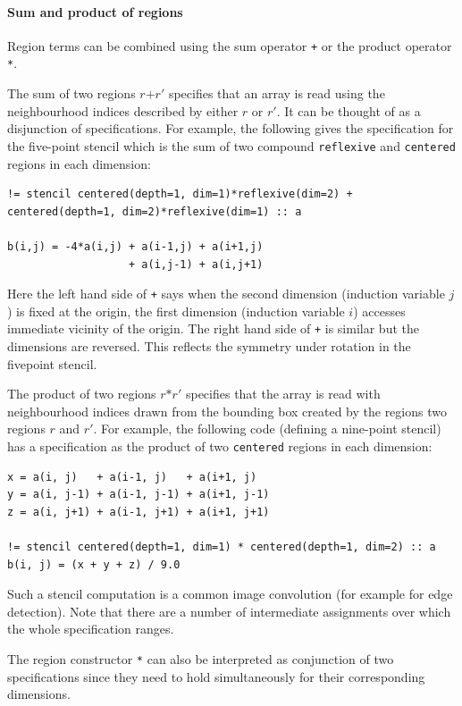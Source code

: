 \documentclass[9pt]{sigplanconf}
\theoremstyle{definition}
\newcommand{\term}[1]{\texttt{#1}}
\begin{document}
\paragraph{Sum and product of regions}
Region terms can be combined using the sum operator
\term{+} or the product operator \term{*}.

The sum of two regions $r \texttt{+} r'$ specifies that an array is
read using the neighbourhood indices described by either $r$ or
$r'$. It can be thought of as a disjunction of specifications. For
example, the following gives the specification for the five-point
stencil which is the sum of two compound \texttt{reflexive} and
\texttt{centered} regions in each dimension:
\begin{verbatim}
!= stencil centered(depth=1, dim=1)*reflexive(dim=2) + centered(depth=1, dim=2)*reflexive(dim=1) :: a

b(i,j) = -4*a(i,j) + a(i-1,j) + a(i+1,j)
                   + a(i,j-1) + a(i,j+1)
\end{verbatim}
Here the left hand side of \texttt{+} says when the second dimension
(induction variable $j$) is fixed at the origin, the first dimension
(induction variable $i$) accesses immediate vicinity of the origin.
The right hand side of \texttt{+} is similar but the dimensions are reversed.
This reflects the symmetry under rotation in the fivepoint stencil.

The product of two regions $r \texttt{*} r'$ specifies that the array
is read with neighbourhood indices drawn from the bounding box created
by the regions two regions $r$ and $r'$. For example, the following
code (defining a nine-point stencil) has a specification as the
product of two \texttt{centered} regions in each dimension:
\begin{verbatim}
x = a(i, j)   + a(i-1, j)   + a(i+1, j)
y = a(i, j-1) + a(i-1, j-1) + a(i+1, j-1)
z = a(i, j+1) + a(i-1, j+1) + a(i+1, j+1)

!= stencil centered(depth=1, dim=1) * centered(depth=1, dim=2) :: a
b(i, j) = (x + y + z) / 9.0
\end{verbatim}
Such a stencil computation is a common image convolution (for example
for edge detection).
Note that there are a number of intermediate assignments over which
the whole specification ranges.

The region constructor \texttt{*} can also be interpreted as conjunction of
two specifications since they need to hold simultaneously for their
corresponding dimensions.
\end{document}

